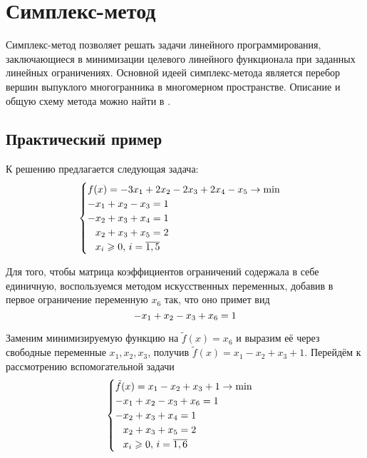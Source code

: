 \section{Симплекс-метод}
\label{sec:simplex}

Симплекс-метод позволяет решать задачи линейного программирования,
заключающиеся в минимизации целевого линейного функционала при
заданных линейных ограничениях. Основной идеей симплекс-метода
является перебор вершин выпуклого многогранника в многомерном
пространстве. Описание и общую схему метода можно найти в
\cite{taha05}.

\subsection{Практический пример}

К решению предлагается следующая задача:
\begin{equation}
  \label{eq:lp-initial}
  \begin{cases}
    f(x) = -3x_1+2x_2-2x_3+2x_4-x_5 \to \min \\
    -x_1+x_2-x_3=1 \\
    -x_2+x_3+x_4=1 \\
    \phm x_2+x_3+x_5=2 \\
    \phm x_i \geq 0,\, i = \overline{1, 5}
  \end{cases}
\end{equation}

Для того, чтобы матрица коэффициентов ограничений содержала в себе
единичную, воспользуемся методом искусственных переменных, добавив в
первое ограничение переменную $x_6$ так, что оно примет вид
\begin{equation*}
  -x_1+x_2-x_3+x_6=1 \\
\end{equation*}

Заменим минимизируемую функцию на $\tilde{f}(x) = x_6$ и выразим её
через свободные переменные $x_1, x_2, x_3$, получив
\mbox{$\tilde{f}(x) = x_1-x_2+x_3+1$}. Перейдём к рассмотрению
вспомогательной задачи
\begin{equation}
  \begin{cases}
    \tilde{f}(x) = x_1-x_2+x_3+1 \to \min \\
    -x_1+x_2-x_3+x_6=1 \\
    -x_2+x_3+x_4=1 \\
    \phm x_2+x_3+x_5=2 \\
    \phm x_i \geq 0,\, i = \overline{1, 6}
  \end{cases}
\end{equation}

